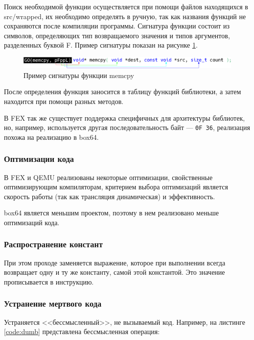 Поиск необходимой функции осуществляется при помощи файлов находящихся в src/wrapped, их необходимо определять в ручную, так как названия функций не сохраняются после компиляции программы. Сигнатура функции состоит из символов, определяющих тип возвращаемого значения и типов аргументов, разделенных буквой F. Пример сигнатуры показан на рисунке \ref{fig:box64sig}.

\begin{figure}[hbtp]
	\centering
	\includegraphics[width=\textwidth]{img/function.eps}
	\caption{Пример сигнатуры функции memcpy}
	\label{fig:box64sig}
\end{figure}

После определения функция заносится в таблицу функций библиотеки, а затем находится при помощи разных методов. \cite{box64_deep}

В FEX так же существует поддержка специфичных для архитектуры библиотек, но, например, используется другая последовательность байт --- \texttt{0F 36}, реализация похожа на реализацию в box64.

\subsubsection{Оптимизации кода}

В FEX и QEMU реализованы некоторые оптимизации, свойственные оптимизирующим компиляторам, критерием выбора оптимизаций является скорость работы (так как трансляция динамическая) и эффективность.

box64 является меньшим проектом, поэтому в нем реализовано меньше оптимизаций кода.

\subsubsection{Распространение констант}

При этом проходе заменяется выражение, которое при выполнении всегда возвращает одну и ту же константу, самой этой константой. Это значение прописывается в инструкцию.

\subsubsection{Устранение мертвого кода}

Устраняется <<бессмысленный>>, не вызываемый код.
Например, на листинге \ref{code:dumb} представлена бессмысленная операция:

